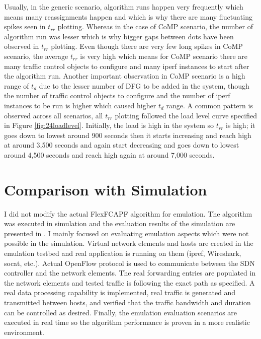 Usually, in the generic scenario, algorithm runs happen very frequently which means many reassignments happen and which is why there are many fluctuating spikes seen in $t_{rr}$ plotting. Whereas in the case of CoMP scenario, the number of algorithm run was lesser which is why bigger gaps between dots have been observed in $t_{rr}$ plotting. Even though there are very few long spikes in CoMP scenario, the average $t_{rr}$ is very high which means for CoMP scenario there are many traffic control objects to configure and many iperf instances to start after the algorithm run. Another important observation in CoMP scenario is a high range of $t_d$ due to the lesser number of DFG to be added in the system, though the number of traffic control objects to configure and the number of iperf instances to be run is higher which caused higher $t_d$ range. A common pattern is observed across all scenarios, all $t_{rr}$ plotting followed the load level curve specified in Figure \ref{fig:24loadlevel}. Initially, the load is high in the system so $t_{rr}$ is high; it goes down to lowest around 900 seconds then it starts increasing and reach high at around 3,500 seconds and again start decreasing and goes down to lowest around 4,500 seconds and reach high again at around 7,000 seconds.

\section{Comparison with Simulation}\label{sec:cws}
I did not modify the actual FlexFCAPF algorithm for emulation. The algorithm was executed in simulation and the evaluation results of the simulation are presented in \cite{7343600}. I mainly focused on evaluating emulation aspects which were not possible in the simulation. Virtual network elements and hosts are created in the emulation testbed and real application is running on them (ipref, Wireshark, socat, etc.). Actual OpenFlow protocol is used to communicate between the SDN controller and the network elements. The real forwarding entries are populated in the network elements and tested traffic is following the exact path as specified. A real data processing capability is implemented, real traffic is generated and transmitted between hosts, and verified that the traffic bandwidth and duration can be controlled as desired. Finally, the emulation evaluation scenarios are executed in real time so the algorithm performance is proven in a more realistic environment.
\begin{figure}[H]
	\begin{center}
	\end{center}
\end{figure}

